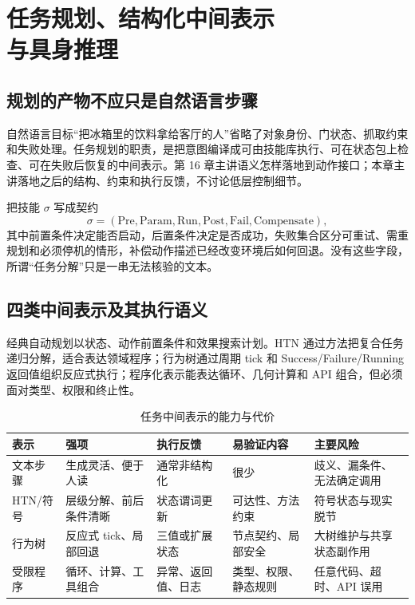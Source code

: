 \chapter[任务规划、结构化中间表示与具身推理]{任务规划、结构化中间表示\\与具身推理}
\label{chap:task-planning-ir}

\section{规划的产物不应只是自然语言步骤}

自然语言目标“把冰箱里的饮料拿给客厅的人”省略了对象身份、门状态、抓取约束和失败处理。任务规划的职责，是把意图编译成可由技能库执行、可在状态包上检查、可在失败后恢复的中间表示。第 16 章主讲语义怎样落地到动作接口；本章主讲落地之后的结构、约束和执行反馈，不讨论低层控制细节。

把技能 $\sigma$ 写成契约
\begin{equation}
\sigma=(\mathrm{Pre},\mathrm{Param},\mathrm{Run},\mathrm{Post},
\mathrm{Fail},\mathrm{Compensate}),
\label{eq:skill-contract}
\end{equation}
其中前置条件决定能否启动，后置条件决定是否成功，失败集合区分可重试、需重规划和必须停机的情形，补偿动作描述已经改变环境后如何回退。没有这些字段，所谓“任务分解”只是一串无法核验的文本。

\section{四类中间表示及其执行语义}

经典自动规划以状态、动作前置条件和效果搜索计划\cite{ghallab2004automatedplanning}。HTN 通过方法把复合任务递归分解，适合表达领域程序；行为树通过周期 tick 和 Success/Failure/Running 返回值组织反应式执行\cite{colledanchise2018behaviortrees}；程序化表示能表达循环、几何计算和 API 组合，但必须面对类型、权限和终止性。

\begin{table}[H]
\centering
\caption{任务中间表示的能力与代价}
\label{tab:task-ir-comparison}
\begin{tabularx}{\textwidth}{p{}YYYY}
\toprule
表示 & 强项 & 执行反馈 & 易验证内容 & 主要风险 \\
\midrule
文本步骤 & 生成灵活、便于人读 & 通常非结构化 & 很少 & 歧义、漏条件、无法确定调用 \\
HTN/符号 & 层级分解、前后条件清晰 & 状态谓词更新 & 可达性、方法约束 & 符号状态与现实脱节 \\
行为树 & 反应式 tick、局部回退 & 三值或扩展状态 & 节点契约、局部安全 & 大树维护与共享状态副作用 \\
受限程序 & 循环、计算、工具组合 & 异常、返回值、日志 & 类型、权限、静态规则 & 任意代码、超时、API 误用 \\
\bottomrule
\end{tabularx}
\end{table}

